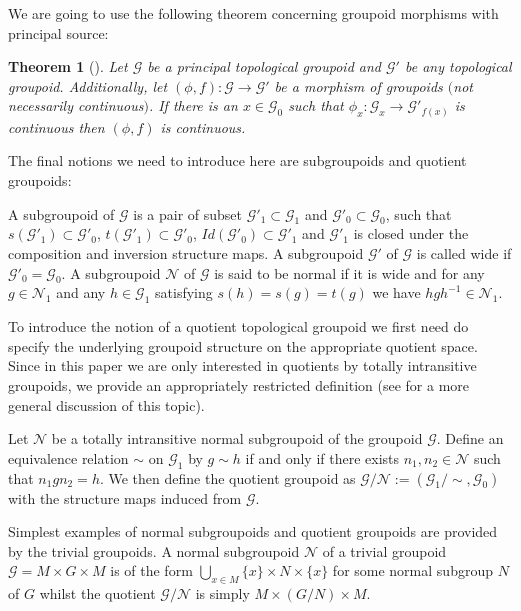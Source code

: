 \documentclass[pdftex]{sigma}
\newtheorem{tw}{Theorem}[section]
\begin{document}
We are going to use the following theorem concerning groupoid morphisms with principal source:
\begin{tw}[{\cite[Proposition 1.21]{McK1}}] \label{AFPG} Let $\mathcal{G}$ be a principal topological groupoid and $\mathcal{G}'$ be any topological groupoid. Additionally, let $(\phi,f)\colon \mathcal{G}\rightarrow\mathcal{G}'$ be a morphism of groupoids $($not necessarily continuous$)$. If there is an $x\in\mathcal{G}_0$ such that $\phi_x\colon \mathcal{G}_x\rightarrow\mathcal{G}'_{f(x)}$ is continuous then $(\phi,f)$ is continuous.
\end{tw}

The final notions we need to introduce here are subgroupoids and quotient groupoids:
\begin{defi} A subgroupoid of $\mathcal{G}$ is a pair of subset $\mathcal{G}'_1\subset\mathcal{G}_1$ and $\mathcal{G}'_0\subset\mathcal{G}_0$, such that $s(\mathcal{G}'_1)\subset\mathcal{G}'_0$, $t(\mathcal{G}'_1)\subset\mathcal{G}'_0$, $Id(\mathcal{G}'_0)\subset\mathcal{G}'_1$ and $\mathcal{G}'_1$ is closed under the composition and inversion structure maps. A subgroupoid $\mathcal{G}'$ of $\mathcal{G}$ is called wide if $\mathcal{G}'_0=\mathcal{G}_0$. A subgroupoid $\mathcal{N}$ of $\mathcal{G}$ is said to be normal if it is wide and for any $g\in\mathcal{N}_1$ and any $h\in\mathcal{G}_1$ satisfying $s(h)=s(g)=t(g)$ we have $hgh^{-1}\in\mathcal{N}_1$.
\end{defi}
To introduce the notion of a quotient topological groupoid we first need do specify the underlying groupoid structure on the appropriate quotient space. Since in this paper we are only interested in quotients by totally intransitive groupoids, we provide an appropriately restricted definition (see \cite{McK1} for a more general discussion of this topic).
\begin{defi} Let $\mathcal{N}$ be a totally intransitive normal subgroupoid of the groupoid $\mathcal{G}$. Define an equivalence relation $\sim$ on $\mathcal{G}_1$ by $g\sim h$ if and only if there exists $n_1,n_2\in\mathcal{N}$ such that $n_1gn_2=h$. We then define the quotient groupoid as $\mathcal{G}\slash\mathcal{N}:=(\mathcal{G}_1\slash\sim,\mathcal{G}_0)$ with the structure maps induced from $\mathcal{G}$.
\end{defi}
\begin{egg} Simplest examples of normal subgroupoids and quotient groupoids are provided by the trivial groupoids. A normal subgroupoid $\mathcal{N}$ of a trivial groupoid $\mathcal{G}=M\times G\times M$ is of the form $\bigcup\limits_{x\in M} \{ x\}\times N\times \{ x\}$ for some normal subgroup $N$ of $G$ whilst the quotient $\mathcal{G}\slash\mathcal{N}$ is simply $M\times (G\slash N)\times M$.
\end{egg}
\end{document}
